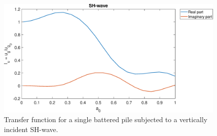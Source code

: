 \documentclass[a4]{article}
\begin{document}
\begin{figure}[tbh!]
	\centering
	\includegraphics[scale=0.5]{sh-wave.eps}
	\caption{Transfer function for a single battered pile subjected to a vertically incident SH-wave.}
	\label{fig:sh-wave}
\end{figure}
\end{document}
